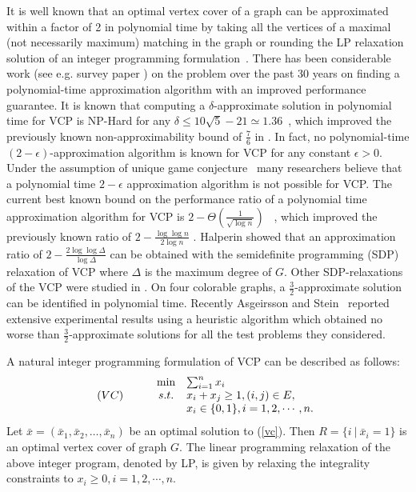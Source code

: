 \documentclass[12pt]{article}
\begin{document}
It is well known that an optimal vertex cover of a graph can be
approximated within a factor of 2 in polynomial time by taking all
the vertices of a maximal (not necessarily maximum) matching in the
graph or rounding the LP relaxation solution of an integer
programming formulation~\cite{nt75}. There has been considerable
work (see e.g. survey paper \cite{hoch}) on the problem over the
past 30 years on finding a polynomial-time approximation algorithm
with an improved performance guarantee.  It is known that computing
a $\delta$-approximate solution in polynomial time for VCP is
NP-Hard for any $\delta\leq 10\sqrt{5}-21\simeq 1.36$~\cite{dinur},
which improved the previously known non-approximability bound of
$\frac 7 6$ in \cite{hastad97}. In fact, no polynomial-time
$(2-\epsilon)$-approximation algorithm is known for VCP for any
constant $\epsilon>0$. Under the assumption of unique game
conjecture~\cite{harb,khot1,khot} many researchers believe that a
polynomial time $2-\epsilon$ approximation algorithm is not possible
for VCP. The current best known bound on the performance ratio of a
polynomial time approximation algorithm for VCP is
$2-\Theta(\frac{1}{\sqrt{\log n}})$
 ~\cite{kara05},  which improved the
previously known ratio of $2-\frac{\log\log n}{2\log n}$
\cite{bar85,monien85}.  Halperin \cite{halperin02} showed that an
approximation ratio of $2-\frac{2\log\log \Delta}{\log \Delta}$ can
be obtained with the semidefinite programming (SDP) relaxation of
VCP where $\Delta$ is the maximum degree of $G$. Other
 SDP-relaxations of the VCP were studied in
 \cite{charikar,goemans98}. On four colorable graphs, a $\frac{3}{2}$-approximate solution can be identified
 in polynomial time.
 Recently Asgeirsson and Stein~\cite{stein,stein1} reported extensive
experimental results using a heuristic algorithm which obtained no
worse than $\frac{3}{2}$-approximate solutions for all the test
problems they considered.


\vskip 5pt
A natural integer programming formulation of VCP can be described as follows:\\
\begin{equation}
\label{vc}(VC) \hskip 15pt
\begin{array}{lcl}
&\min & \sum_{i=1}^nx_i \\
&s.t. & x_i+x_j\ge 1, (i,j)\in E,\\
 &    & x_i\in \{0, 1\}, i=1,2,\cdots,n.
\end{array}
\end{equation}
Let $\bar{x}=(\bar{x}_1,\bar{x}_2,\ldots ,\bar{x}_n)$ be an optimal
solution  to (\ref{vc}). Then  $R=\{i\ | \ \bar{x}_i=1\}$ is an
optimal vertex cover of graph $G$. The linear programming relaxation
of the above integer program, denoted by LP, is given by relaxing the integrality constraints to $x_i\ge 0, i=1,2,\cdots,n$.
\end{document}
